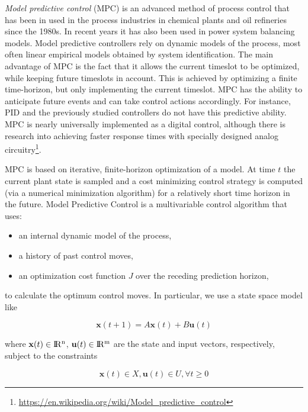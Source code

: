 \textit{Model predictive control} (MPC) is an advanced method of process control that has been in used in the process industries in chemical plants and oil refineries since the 1980s. In recent years it has also been used in power system balancing models. Model predictive controllers rely on dynamic models of the process, most often linear empirical models obtained by system identification. The main advantage of MPC is the fact that it allows the current timeslot to be optimized, while keeping future timeslots in account. This is achieved by optimizing a finite time-horizon, but only implementing the current timeslot. MPC has the ability to anticipate future events and can take control actions accordingly. For instance, PID and the previously studied controllers do not have this predictive ability. MPC is nearly universally implemented as a digital control, although there is research into achieving faster response times with specially designed analog circuitry\footnote{\url{https://en.wikipedia.org/wiki/Model_predictive_control}}.

\noindent MPC is based on iterative, finite-horizon optimization of a model. At time $t$ the current plant state is sampled and a cost minimizing control strategy is computed (via a numerical minimization algorithm) for a relatively short time horizon in the future. Model Predictive Control is a multivariable control algorithm that uses:

\begin{itemize}
	\item an internal dynamic model of the process,
	\item a history of past control moves,
	\item an optimization cost function $J$ over the receding prediction horizon,
\end{itemize}

\noindent to calculate the optimum control moves. In particular, we use a state space model like

\begin{equation}
	\mathbf{x}(t+1) = A\mathbf{x}(t) + B\mathbf{u}(t)
\end{equation}

\noindent where $\mathbf{x}(t) \in \rm I\!R^n$, $\mathbf{u}(t) \in \rm I\!R^m$ are the state and input vectors, respectively, subject to the constraints 

\begin{equation}
	\mathbf{x}(t) \in X, \mathbf{u}(t) \in U, \forall t \ge 0
\end{equation}  

